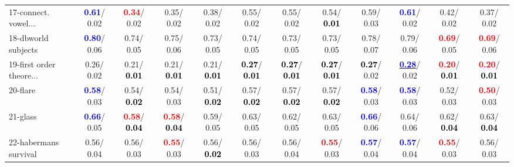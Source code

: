 \begin{table}[h]
\begin{center}
{\begin{tabular}{lc|c|c|c|c|c|c|c|c|c|c}
17-connect. vowel... & \textcolor{blue}{\textbf{  0.61}}/  0.02 & \textcolor{red}{\textbf{  0.34}}/  0.02 &   0.35/  0.02 &   0.38/  0.02 &   0.55/  0.02 &   0.55/  0.02 &   0.54/\textcolor{black}{\textbf{  0.01}} &   0.59/  0.03 & \textcolor{blue}{\textbf{  0.61}}/  0.02 &   0.42/  0.02 &   0.37/  0.02 \\
18-dbworld subjects & \textcolor{blue}{\textbf{  0.80}}/  0.06 &   0.74/  0.05 &   0.75/  0.06 &   0.73/  0.05 &   0.74/  0.05 &   0.73/  0.05 &   0.73/  0.05 &   0.78/  0.07 &   0.79/  0.06 & \textcolor{red}{\textbf{  0.69}}/  0.05 & \textcolor{red}{\textbf{  0.69}}/  0.06 \\
19-first order theore... &   0.26/  0.02 &   0.21/\textcolor{black}{\textbf{  0.01}} &   0.21/\textcolor{black}{\textbf{  0.01}} &   0.21/\textcolor{black}{\textbf{  0.01}} & \textcolor{black}{\textbf{  0.27}}/\textcolor{black}{\textbf{  0.01}} & \textcolor{black}{\textbf{  0.27}}/\textcolor{black}{\textbf{  0.01}} & \textcolor{black}{\textbf{  0.27}}/\textcolor{black}{\textbf{  0.01}} & \textcolor{black}{\textbf{  0.27}}/  0.02 & \underline{\textcolor{blue}{\textbf{  0.28}}}/  0.02 & \textcolor{red}{\textbf{  0.20}}/\textcolor{black}{\textbf{  0.01}} & \textcolor{red}{\textbf{  0.20}}/\textcolor{black}{\textbf{  0.01}} \\
20-flare & \textcolor{blue}{\textbf{  0.58}}/  0.03 &   0.54/\textcolor{black}{\textbf{  0.02}} &   0.54/  0.03 &   0.51/\textcolor{black}{\textbf{  0.02}} &   0.57/\textcolor{black}{\textbf{  0.02}} &   0.57/\textcolor{black}{\textbf{  0.02}} &   0.57/\textcolor{black}{\textbf{  0.02}} & \textcolor{blue}{\textbf{  0.58}}/  0.03 & \textcolor{blue}{\textbf{  0.58}}/  0.03 &   0.52/  0.03 & \textcolor{red}{\textbf{  0.50}}/  0.03 \\
21-glass & \textcolor{blue}{\textbf{  0.66}}/  0.05 & \textcolor{red}{\textbf{  0.58}}/\textcolor{black}{\textbf{  0.04}} & \textcolor{red}{\textbf{  0.58}}/\textcolor{black}{\textbf{  0.04}} &   0.59/  0.05 &   0.63/  0.05 &   0.62/  0.05 &   0.63/  0.05 & \textcolor{blue}{\textbf{  0.66}}/  0.06 &   0.64/  0.06 &   0.62/\textcolor{black}{\textbf{  0.04}} &   0.63/\textcolor{black}{\textbf{  0.04}} \\ \hline
22-habermans survival &   0.56/  0.04 &   0.56/  0.03 & \textcolor{red}{\textbf{  0.55}}/  0.03 &   0.56/\textcolor{black}{\textbf{  0.02}} &   0.56/  0.03 &   0.56/  0.04 & \textcolor{red}{\textbf{  0.55}}/  0.03 & \textcolor{blue}{\textbf{  0.57}}/  0.04 & \textcolor{blue}{\textbf{  0.57}}/  0.04 & \textcolor{red}{\textbf{  0.55}}/  0.03 &   0.56/  0.03 \\

\end{tabular}}
\end{center}
\end{table}
